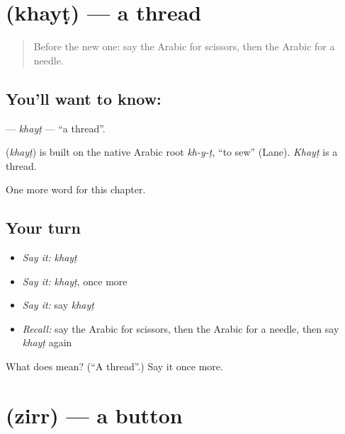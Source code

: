 \section[\texorpdfstring{\ar{خيط} (khayṭ)}{خيط (khayṭ)}]{ (khayṭ) — a thread}

\label{lesson:AR-C124-khayt}



\begin{quote}
Before the new one: say the Arabic for scissors, then the Arabic for a needle.
\end{quote}

\subsection*{You'll want to know: }
\textbf{} — \emph{khayṭ} — \textquotedblleft{}a thread\textquotedblright{}.

\begin{cousinweb}
\textbf{} (\emph{khayṭ}) is built on the native Arabic root \emph{kh-y-ṭ}, \textquotedblleft{}to sew\textquotedblright{} (Lane). \emph{Khayṭ} is a thread.
\end{cousinweb}

\begin{grammarlens}[title={What you've built}]
One more word for this chapter.
\end{grammarlens}

\subsection*{Your turn}
\begin{itemize}
\raggedright
  \item \emph{Say it:} \emph{khayṭ}
  \item \emph{Say it:} \emph{khayṭ}, once more
  \item \emph{Say it:} say \emph{khayṭ}
  \item \emph{Recall:} say the Arabic for scissors, then the Arabic for a needle, then say \emph{khayṭ} again
\end{itemize}

\begin{tcolorbox}[breakable,colback=teal!4,colframe=teal!35!black,title={Before you move on}]
What does  mean? (\textquotedblleft{}A thread\textquotedblright{}.) Say it once more.
\end{tcolorbox}
\section[\texorpdfstring{\ar{زر} (zirr)}{زر (zirr)}]{ (zirr) — a button}

